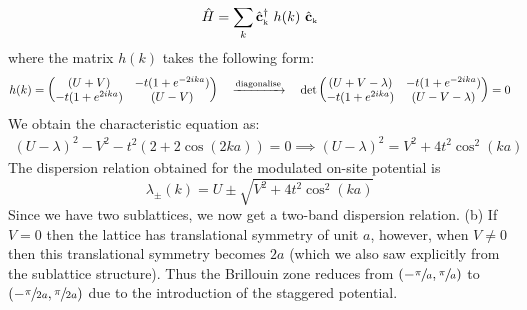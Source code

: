 \documentclass[usenames, svgnames, dvipsnames]{scrartcl}
\newcommand{\tund}[1]{_{\text{\tiny #1}}}
\begin{document}
\begin{align*}
    \hat{H} = \sum\limits_{k} \hat{\vb{c}}\tund{k}^\dagger\ h(k) \ \hat{\vb{c}}\tund{k}
\end{align*}
where the matrix $h(k)$ takes the following form: 
$$h(k) = \mqty((U+V) & -t(1+e^{-2ika})\\ -t(1+e^{2ika})& (U-V))\quad \xrightarrow{\text{diagonalise}}\quad \det\mqty((U+V-\lambda) & -t(1+e^{-2ika})\\ -t(1+e^{2ika})& (U-V -\lambda)) =0$$
We obtain the characteristic equation as:
\begin{align*}
    (U-\lambda)^2 - V^2 -t^2(2+2\cos(2ka)) =0 \implies  (U-\lambda)^2 = V^2 +4t^2\cos^2(ka) 
\end{align*}
The dispersion relation obtained for the modulated on-site potential is  
$$\boxed{\lambda_{\pm}(k) = U\pm \sqrt{V^2 +4t^2\cos^2(ka)}}$$
Since we have two sublattices, we now get a two-band dispersion relation.
(b) If $V=0$ then the lattice has translational symmetry of unit $a$, however, when $V\neq 0$ then this translational symmetry becomes $2a$ (which we also saw explicitly from the sublattice structure). Thus the Brillouin zone reduces from $\qty(-\sfrac{\pi}{a},\sfrac{\pi}{a})$ to $\qty(-\sfrac{\pi}{2a},\sfrac{\pi}{2a})$ due to the introduction of the staggered potential.\\[0.2cm] 
\end{document}
